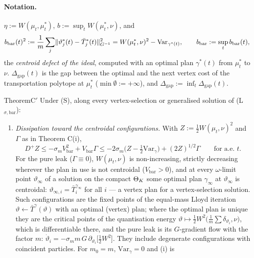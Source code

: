 \paragraph{Notation.} $\eta := W(\mu_t,\mu^*_t)$, $b := \sup_t W(\mu^*_t,\nu)$, and
\[
  b_{\mathrm{bar}}(t)^2 := \frac1m\sum_j\lVert \vartheta^*_j(t) - \bar T^*_j(t)\rVert^2_{G^{-1}}
  = W(\mu^*_t,\nu)^2 - \mathrm{Var}_{\gamma^*(t)},\qquad
  b_{\mathrm{bar}} := \sup_t b_{\mathrm{bar}}(t),
\]
the \emph{centroid defect of the ideal}, computed with an optimal plan $\gamma^*(t)$ from $\mu^*_t$ to $\nu$.
$\Delta_{\mathrm{gap}}(t)$ is the gap between the optimal and the next vertex cost of the transportation polytope at
$\mu^*_t$ ($\min\emptyset := +\infty$), and $\Delta_{\mathrm{gap}} := \inf_t\Delta_{\mathrm{gap}}(t)$.

\begin{thm}{Theorem}{C$'$}
Under \textup{(S)}, along every vertex-selection or generalised solution of \textup{(L$_{\sigma,\mathrm{bar}}$)}:
\begin{enumerate}[label=\textup{(\roman*)}]
  \item \emph{Dissipation toward the centroidal configurations.} With $Z := \frac12W(\mu_t,\nu)^2$ and $\Gamma$ as in
    Theorem C(i),
    \[
      D^+Z \le -\sigma_mV_{\mathrm{bar}}^2 + V_{\mathrm{bar}}\Gamma
      \le -2\sigma_m\bigl(Z - \tfrac12\mathrm{Var}_\gamma\bigr) + (2Z)^{1/2}\Gamma
      \qquad\text{for a.e.\ } t.
    \]
    For the pure leak \textup{(}$\Gamma\equiv0$\textup{)}, $W(\mu_t,\nu)$ is non-increasing, strictly decreasing
    wherever the plan in use is not centroidal \textup{(}$V_{\mathrm{bar}}>0$\textup{)}, and at every $\omega$-limit
    point $\vartheta_\infty$ of a solution on the compact $\Theta_K$ some optimal plan $\gamma_\infty$ at
    $\vartheta_\infty$ is centroidal: $\vartheta_{\infty,i} = \bar T_i^{\gamma_\infty}$ for all $i$ --- a vertex plan
    for a vertex-selection solution. Such configurations are the fixed points of the equal-mass Lloyd iteration
    $\vartheta\leftarrow\bar T^\gamma(\vartheta)$ with an optimal \textup{(}vertex\textup{)} plan; where the optimal
    plan is unique they are the critical points of the quantisation energy
    $\vartheta\mapsto\frac12W^2\bigl(\frac1m\sum\delta_{\vartheta_i},\nu\bigr)$, which is differentiable there, and the
    pure leak is its $G$-gradient flow with the factor $m$:
    $\dot\vartheta_i = -\sigma_m m\,G\,\partial_{\vartheta_i}\bigl[\tfrac12W^2\bigr]$. They include degenerate
    configurations with coincident particles. For $m_0 = m$, $\mathrm{Var}_\gamma = 0$ and \textup{(i)} is

\end{enumerate}
\end{thm}
